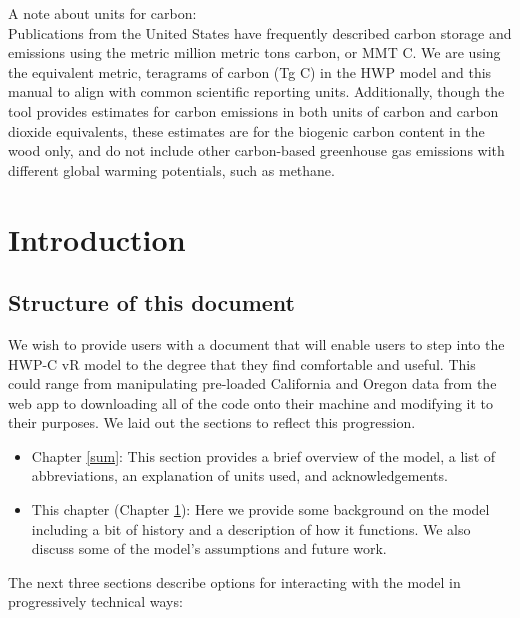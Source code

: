 \documentclass[
  openany]{book}
\providecommand{\tightlist}{%
  \setlength{\itemsep}{0pt}\setlength{\parskip}{0pt}}
\begin{document}
A note about units for carbon:\\
Publications from the United States have frequently described carbon storage and emissions using the metric million metric tons carbon, or MMT C. We are using the equivalent metric, teragrams of carbon (Tg C) in the HWP model and this manual to align with common scientific reporting units. Additionally, though the tool provides estimates for carbon emissions in both units of carbon and carbon dioxide equivalents, these estimates are for the biogenic carbon content in the wood only, and do not include other carbon-based greenhouse gas emissions with different global warming potentials, such as methane.

\hypertarget{int}{%
\chapter{Introduction}\label{int}}

\hypertarget{int-struc}{%
\section{Structure of this document}\label{int-struc}}

We wish to provide users with a document that will enable users to step into the HWP-C vR model to the degree that they find comfortable and useful. This could range from manipulating pre-loaded California and Oregon data from the web app to downloading all of the code onto their machine and modifying it to their purposes. We laid out the sections to reflect this progression.

\begin{itemize}
\tightlist
\item
  Chapter \ref{sum}: This section provides a brief overview of the model, a list of abbreviations, an explanation of units used, and acknowledgements.\\
\item
  This chapter (Chapter \ref{int}): Here we provide some background on the model including a bit of history and a description of how it functions. We also discuss some of the model's assumptions and future work.
\end{itemize}

The next three sections describe options for interacting with the model in progressively technical ways:
\end{document}
